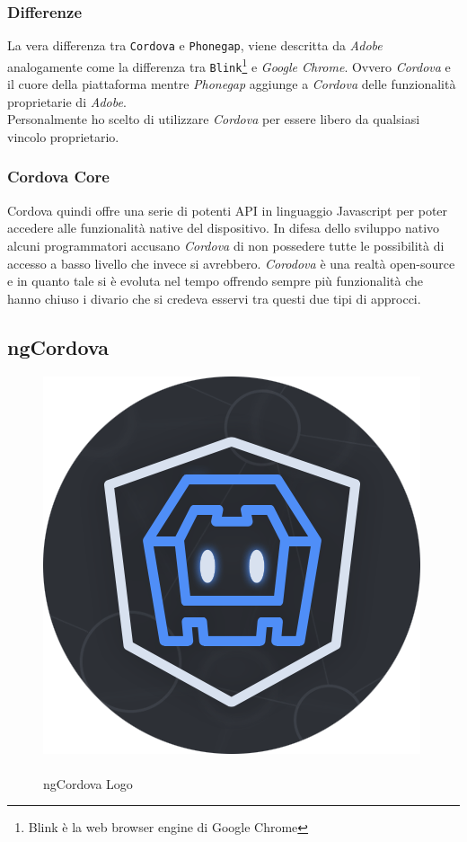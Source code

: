 \subsubsection{Differenze}
La vera differenza tra \texttt{Cordova} e \texttt{Phonegap}, viene descritta da \emph{Adobe} analogamente come la differenza tra \texttt{Blink}\footnote{Blink è la web browser engine di Google Chrome\cite{wiki:blink}} e \emph{Google Chrome}. Ovvero \emph{Cordova} e il cuore della piattaforma mentre \emph{Phonegap} aggiunge a \emph{Cordova} delle funzionalità proprietarie di \emph{Adobe}.\\
Personalmente ho scelto di utilizzare \emph{Cordova} per essere libero da qualsiasi vincolo proprietario.

\subsubsection{Cordova Core}
Cordova quindi offre una serie di potenti API in linguaggio Javascript per poter accedere alle funzionalità native del dispositivo. In difesa dello sviluppo nativo alcuni programmatori accusano \emph{Cordova} di non possedere tutte le possibilità di accesso a basso livello che invece si avrebbero. \emph{Corodova} è una realtà open-source e in quanto tale si è evoluta nel tempo offrendo sempre più funzionalità che hanno chiuso i divario che si credeva esservi tra questi due tipi di approcci.

\subsection{ngCordova}
\label{sec:ngCordova}
\begin{figure}
  \vspace{-65pt}
  \begin{center}
    \includegraphics[scale=0.35]{Figures/ngcordova-logo.png}
  \end{center}
  \vspace{-10pt}
  \caption{\\ngCordova Logo}
  \label{fig:ngCordova}
  \vspace{0pt}
\end{figure}

